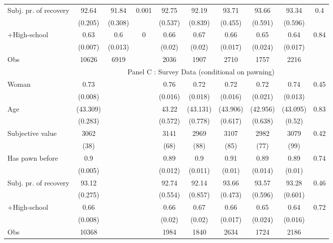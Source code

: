 \begin{tabular}{lccccccccc}
Subj. pr. of recovery & 92.64 & 91.84 & 0.001 & 92.75 & 92.19 & 93.71 & 93.66 & 93.34 & 0.4 \\
      & (0.205) & (0.308) &       & (0.537) & (0.839) & (0.455) & (0.591) & (0.596) &  \\
+High-school & 0.63  & 0.6   & 0     & 0.66  & 0.67  & 0.66  & 0.65  & 0.64  & 0.84 \\
      & (0.007) & (0.013) &       & (0.02) & (0.02) & (0.017) & (0.024) & (0.017) &  \\
\midrule
Obs   & 10626 & 6919  &       & 2036  & 1907  & 2710  & 1757  & 2216  &  \\
\midrule
      & \multicolumn{9}{c}{Panel C : Survey Data (conditional on pawning)} \\
\midrule
Woman & 0.73  &       &       & 0.76  & 0.72  & 0.72  & 0.72  & 0.74  & 0.45 \\
      & (0.008) &       &       & (0.016) & (0.018) & (0.016) & (0.021) & (0.013) &  \\
Age   & (43.309) &       &       & 43.22 & (43.131) & (43.906) & (42.956) & (43.095) & 0.83 \\
      & (0.283) &       &       & (0.572) & (0.778) & (0.617) & (0.638) & (0.52) &  \\
Subjective value & 3062  &       &       & 3141  & 2969  & 3107  & 2982  & 3079  & 0.42 \\
      & (38)  &       &       & (68)  & (88)  & (85)  & (77)  & (99)  &  \\
Has pawn before & 0.9   &       &       & 0.89  & 0.9   & 0.91  & 0.89  & 0.89  & 0.74 \\
      & (0.005) &       &       & (0.012) & (0.011) & (0.01) & (0.014) & (0.01) &  \\
Subj. pr. of recovery & 93.12 &       &       & 92.74 & 92.14 & 93.66 & 93.57 & 93.28 & 0.46 \\
      & (0.275) &       &       & (0.554) & (0.857) & (0.473) & (0.596) & (0.601) &  \\
+High-school & 0.66  &       &       & 0.66  & 0.67  & 0.66  & 0.65  & 0.64  & 0.72 \\
      & (0.008) &       &       & (0.02) & (0.02) & (0.017) & (0.024) & (0.016) &  \\
\midrule
Obs   & 10368 &       &       & 1984  & 1840  & 2634  & 1724  & 2186  &  \\
\bottomrule
\bottomrule
\end{tabular}%
